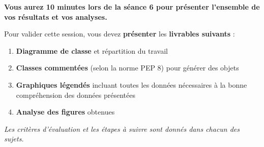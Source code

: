 
\textbf{Vous aurez 10 minutes lors de la séance 6 pour présenter l'ensemble de vos résultats et vos analyses.}

Pour valider cette session, vous devez \textbf{présenter} les \textbf{livrables suivants} :

\begin{enumerate}
\item \textbf{Diagramme de classe} et répartition du travail
\item \textbf{Classes commentées} (selon la norme PEP 8) pour générer des objets 
\item \textbf{Graphiques légendés} incluant toutes les données nécessaires à la bonne compréhension des données présentées
\item \textbf{Analyse des figures} obtenues 
\end{enumerate}

\bigskip

\textit{Les critères d'évaluation et les étapes à suivre sont donnés dans chacun des sujets.}
